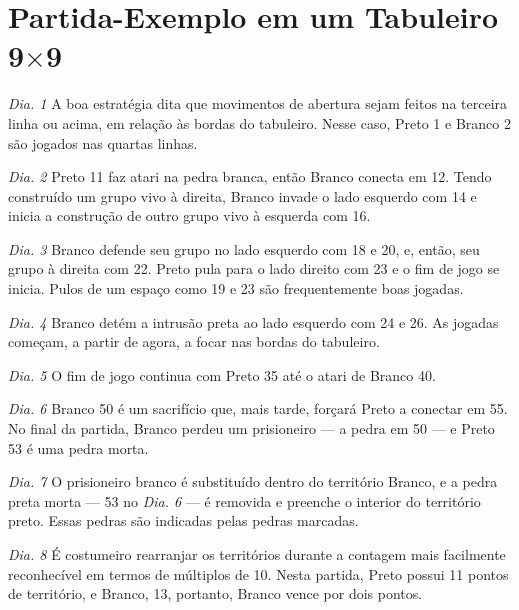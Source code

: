 \section{Partida-Exemplo em um Tabuleiro \texorpdfstring{9$\times$9}{9x9}}

\emph{Dia. 1} A boa estratégia dita que movimentos de abertura sejam feitos na terceira linha ou acima, em relação às bordas do tabuleiro. Nesse caso, Preto 1 e Branco 2 são jogados nas quartas linhas.

\emph{Dia. 2} Preto 11 faz atari na pedra branca, então Branco conecta em 12. Tendo construído um grupo vivo à direita, Branco invade o lado esquerdo com 14 e inicia a construção de outro grupo vivo à esquerda com 16.

\emph{Dia. 3} Branco defende seu grupo no lado esquerdo com 18 e 20, e, então, seu grupo à direita com 22. Preto pula para o lado direito com 23 e o fim de jogo se inicia. Pulos de um espaço como 19 e 23 são frequentemente boas jogadas.

\emph{Dia. 4} Branco detém a intrusão preta ao lado esquerdo com 24 e 26. As jogadas começam, a partir de agora, a focar nas bordas do tabuleiro.

\emph{Dia. 5} O fim de jogo continua com Preto 35 até o atari de Branco 40.

\emph{Dia. 6} Branco 50 é um sacrifício que, mais tarde, forçará Preto a conectar em 55. No final da partida, Branco perdeu um prisioneiro --- a pedra em 50 --- e Preto 53 é uma pedra morta.

\emph{Dia. 7} O prisioneiro branco é substituído dentro do território Branco, e a pedra preta morta --- 53 no \emph{Dia. 6} --- é removida e preenche o interior do território preto. Essas pedras são indicadas pelas pedras marcadas.

\emph{Dia. 8} É costumeiro rearranjar os territórios durante a contagem mais facilmente reconhecível em termos de múltiplos de 10. Nesta partida, Preto possui 11 pontos de território, e Branco, 13, portanto, Branco vence por dois pontos.